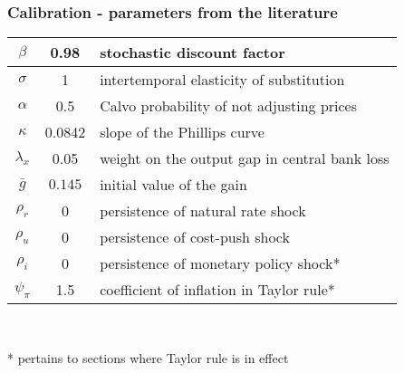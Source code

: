 \documentclass[10pt]{beamer}
\begin{document}
\begin{frame}
	\frametitle{Calibration - parameters from the literature}

\begin{center}
\begin{table}
\begin{tabular}{ c | c  | l }
\hline
 $\beta$ & 0.98 & stochastic discount factor \\  \hline
 $\sigma$ & 1  & intertemporal elasticity of substitution \\  \hline
 $\alpha$ & 0.5 &  Calvo probability of not adjusting prices \\\hline
 $\kappa$ & 0.0842 &  slope of the Phillips curve \\\hline
 $\lambda_x$ & 0.05 & weight on the output gap in central bank loss   \\ \hline 
  $\bar{g}$ & $0.145$  & initial value of the gain \\\hline  
 $\rho_r$ & 0 &   persistence of natural rate shock \\ \hline 
 $\rho_u$ & 0  &  persistence of cost-push shock  \\ \hline
 $\rho_i$ & 0 &  persistence of monetary policy shock*  \\ \hline
$\psi_{\pi} $& 1.5  & coefficient of inflation in Taylor rule*\\\hline

   \end{tabular}     
   \label{calibration_lit}
 \end{table}
\end{center}

\

\small{* pertains to sections where Taylor rule is in effect}

\end{frame}

\end{document}

